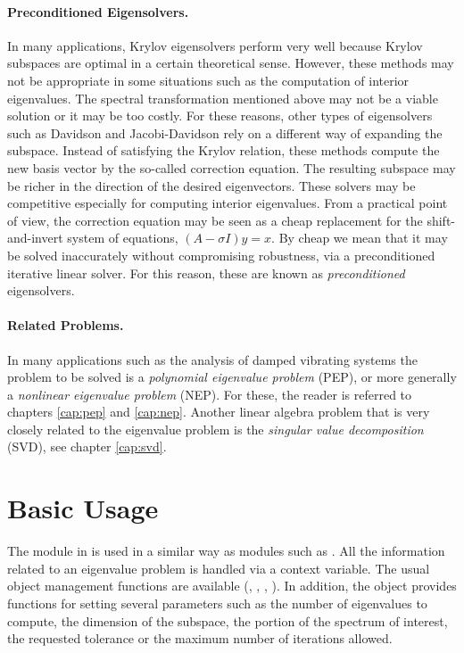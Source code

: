 \paragraph{Preconditioned Eigensolvers.}
	In many applications, Krylov eigensolvers perform very well because Krylov subspaces are optimal in a certain theoretical sense. However, these methods may not be appropriate in some situations such as the computation of interior eigenvalues. The spectral transformation mentioned above may not be a viable solution or it may be too costly. For these reasons, other types of eigensolvers such as Davidson and Jacobi-Davidson rely on a different way of expanding the subspace. Instead of satisfying the Krylov relation, these methods compute the new basis vector by the so-called correction equation. The resulting subspace may be richer in the direction of the desired eigenvectors. These solvers may be competitive especially for computing interior eigenvalues. From a practical point of view, the correction equation may be seen as a cheap replacement for the shift-and-invert system of equations, $(A-\sigma I)y=x$. By cheap we mean that it may be solved inaccurately without compromising robustness, via a preconditioned iterative linear solver. For this reason, these are known as \emph{preconditioned} eigensolvers.

\paragraph{Related Problems.}

	In many applications such as the analysis of damped vibrating systems the problem to be solved is a \emph{polynomial eigenvalue problem} (PEP), or more generally a \emph{nonlinear eigenvalue problem} (NEP). For these, the reader is referred to chapters \ref{cap:pep} and \ref{cap:nep}. Another linear algebra problem that is very closely related to the eigenvalue problem is the {\em singular value decomposition\/} (SVD), see chapter \ref{cap:svd}.

\section{Basic Usage}

	The  module in \slepc is used in a similar way as \petsc modules such as . All the information related to an eigenvalue problem is handled via a context variable. The usual object management functions are available (, , , ). In addition, the  object provides functions for setting several parameters such as the number of eigenvalues to compute, the dimension of the subspace, the portion of the spectrum of interest, the requested tolerance or the maximum number of iterations allowed.

